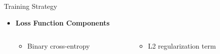\documentclass{beamer}
\begin{document}
\begin{frame}{Training Strategy}
\begin{itemize}
        \item \textbf{Loss Function Components}
            \begin{minipage}{\textwidth}
                \begin{columns}
                    \begin{column}{0.45\textwidth}
                        \begin{itemize}
                            \item Binary cross-entropy
                        \end{itemize}
                    \end{column}
                    \begin{column}{0.45\textwidth}
                        \begin{itemize}
                            \item L2 regularization term
                        \end{itemize}
                    \end{column}
                \end{columns}
            \end{minipage}
    \end{itemize}
\end{frame}
\end{document}
